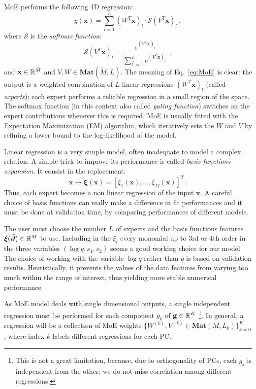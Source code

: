 MoE performs the following 1D regression:
\begin{equation} \label{eq:MoE}
	y(\mathbf{x}) = \sum_{l=1}^L (W^T \mathbf{x})_l \cdot \mathcal{S}(V^T\mathbf{x})_l \ ,
\end{equation}
where $\mathcal{S}$ is the \textit{softmax function}:
\begin{equation} \label{eq:softmax}
	\mathcal{S}(V^T{\mathbf{x}})_l = \frac{e^{(V^T{\mathbf{x}})_l}}{\sum_{l^\prime = 1}^L e^{(V^T{\mathbf{x}})_{l^\prime}}} \ ,
\end{equation}
and ${\mathbf{x}} \in \mathbb{R}^{\tilde{M}}$ and $V,W \in \mathbf{Mat}(\tilde{M},L)$.
The meaning of Eq.~\eqref{eq:MoE} is clear: the output is a weighted combination of $L$ linear regressions $(W^T \mathbf{x})_l$ (called \textit{experts}); each expert performs a reliable regression in a small region of the space. The softmax function (in this context also called \textit{gating function}) switches on the expert contributions whenever this is required.
MoE is usually fitted with the Expectation Maximization (EM) algorithm, which iteratively sets the $W$ and $V$ by refining a lower bound to the log-likelihood of the model.

Linear regression is a very simple model, often inadequate to model a complex relation. A simple trick to improve its performance is called \textit{basis functions expansion}. It consist in the replacement:
\begin{equation}
	{\mathbf{x}} \longrightarrow {\boldsymbol{\xi}}({\mathbf{x}}) = [\xi_1({\mathbf{x}}), \ldots, \xi_M({\mathbf{x}})]^T \ .
\end{equation}
Thus, each expert becomes a non linear regression of the input ${\mathbf{x}}$.
A careful choice of basis functions can really make a difference in fit performances 
and it must be done at validation time, by comparing performances of different models.

The user must choose the number $L$ of experts and the basis functions features ${\boldsymbol{\xi}}({\tilde{\boldsymbol{\vartheta}}}) \in \mathbb{R}^{M}$ to use.
Including in the $\xi_i$ every monomial up to 3rd or 4th order in the three variables $ (\log q, s_1, s_2)$ seems a good working choice for our model
The choice of working with the variable $\log q$ rather than $q$ is based on validation results.
Heuristically, it prevents the values of the data features from varying too much within the 
range of interest, thus yielding more stable numerical performance.

As MoE model deals with single dimensional outputs, a single independent regression must be performed for each component $g_k$ of $\mathbf{g} \in \mathbb{R}^K$
\footnote{This is not a great limitation, because, due to orthogonality of PCs, each $g_j$ is independent from the other: we do not miss correlation among different regressions.}.
In general, a regression will be a collection of MoE weights ${\{ W^{(k)}, V^{(k)} \in \mathbf{Mat}(M,L_k) \}_{k=0}^K}$, where index $k$ labels different regressions for each PC.

